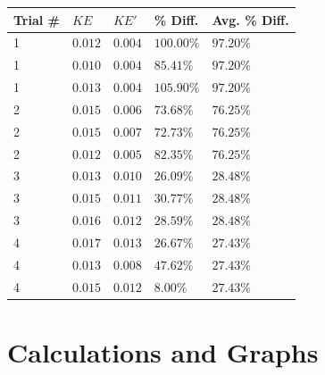 \documentclass{article}
\theoremstyle{definition}
\begin{document}
\begin{center}
    \begin{tabular}{|m{4em} | m{1cm} | m{1cm} | m{2cm}| m{2cm}|} 
    \hline
    Trial \# & $KE$ & $KE'$ & \% Diff. &  Avg. \% Diff. \\ 
    \hline\hline
    1 & $0.012$ & $0.004$ & $100.00\%$ & $97.20\%$ \\ 
    \hline
    1 & $0.010$ & $0.004$ & $85.41\%$ & $97.20\%$ \\ 
    \hline
    1 & $0.013$ & $0.004$ & $105.90\%$ & $97.20\%$ \\ 
    \hline
    2 & $0.015$ & $0.006$ & $73.68\%$ & $76.25\%$ \\ 
    \hline
    2 & $0.015$ & $0.007$ & $72.73\%$ & $76.25\%$ \\ 
    \hline
    2 & $0.012$ & $0.005$ & $82.35\%$ & $76.25\%$ \\ 
    \hline\hline
    3 & $0.013$ & $0.010$ & $26.09\%$ & $28.48\%$ \\ 
    \hline
    3 & $0.015$ & $0.011$ & $30.77\%$ & $28.48\%$ \\ 
    \hline
    3 & $0.016$ & $0.012$ & $28.59\%$ & $28.48\%$ \\ 
    \hline
    4 & $0.017$ & $0.013$ & $26.67\%$ & $27.43\%$ \\ 
    \hline
    4 & $0.013$ & $0.008$ & $47.62\%$ & $27.43\%$ \\ 
    \hline
    4 & $0.015$ & $0.012$ & $8.00\%$ & $27.43\%$ \\ 
    \hline
   \end{tabular}
\end{center}

\section{Calculations and Graphs}
\end{document}
